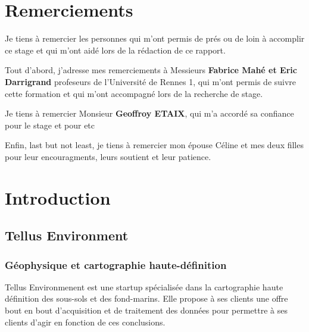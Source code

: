 \documentclass[12pt,a4paper]{report}
\begin{document}
\listoftodos


\cleardoublepage%

\chapter*{Remerciements}%
\thispagestyle{empty}%


Je tiens à remercier les personnes qui m'ont permis de prés ou de loin à accomplir ce stage et qui m'ont aidé lors de la rédaction de ce rapport.

Tout d'abord, j'adresse mes remerciements à Messieurs \textbf{Fabrice Mahé et Eric Darrigrand} profeseurs de l'Université de Rennes 1, qui m'ont permis de suivre cette formation et qui m'ont accompagné lors de la recherche de stage.

Je tiens à remercier Monsieur \textbf{Geoffroy ETAIX}, qui m'a accordé sa confiance pour le stage et pour etc 

Enfin, last but not least, je tiens à remercier mon épouse Céline et mes deux filles pour leur encouragments, leurs soutient et leur patience.


\tableofcontents
\newpage

\chapter{Introduction}
	\section{Tellus Environment}
	
	\subsection{Géophysique et cartographie haute-définition}
	Tellus Environmenent est une startup spécialisée dans la cartographie haute définition des sous-sols et des fond-marins. Elle propose à ses clients une offre bout en bout d'acquisition et de traitement des données pour permettre à ses clients d'agir en fonction de ces conclusions.
	
\end{document}
